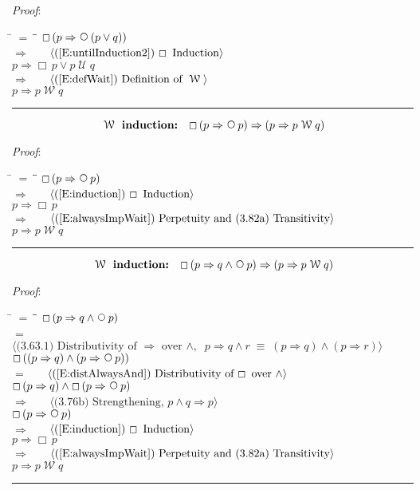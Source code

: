 \documentclass[12pt, fleqn, leqno]{article}
\newcommand{\lgap}{2pt}                             %
\newcommand{\mymathindent}{24pt}                    %
\newcommand{\equivs}{\ensuremath{\;\equiv\;}}       %
\newcommand{\impl}{\ensuremath{\Rightarrow}}        %
\newcommand{\Until}{\;\mathcal{U}\;}
\newcommand{\Wait}{\;\mathcal{W}\;}
\newcommand{\Next}{\;\,\text{\raisebox{3.5pt}{\circle{6}}}}
\newcommand{\Always}{\Box\,}
\newcommand{\myqed}{\rule[-.23ex]{1.2ex}{2.0ex}}
\newcommand{\myqedtab}{\hspace{384pt}}              %
\newcommand{\Gll} {\langle}                         %
\newcommand{\Ggg} {\rangle}                         %
\newcommand{\Hint}[1]     {\ \ \ $\Gll              \mbox{#1} \Ggg$ }   %
\begin{document}
\emph{Proof}:
\begin{tabbing}
\hspace{\mymathindent} \= $= \;$ \= \myqedtab \= \kill
  \> \>   $\Always (p \impl \Next (p\lor q))$\\[\lgap]
  \> $\impl$  \>  \Hint{(\ref{E:untilInduction2}) $\Always$ Induction}\\[\lgap]
  \> \>   $p \impl \Always p\lor p\Until q$\\[\lgap]
  \> $\impl$  \>  \Hint{(\ref{E:defWait}) Definition of $\Wait$}\\[\lgap]
  \> \>   $p \impl p \Wait q$ \quad \myqed
\end{tabbing}
\begin{equation}\label{E:waitInduct1}
\textbf{$\Wait$ induction:}\quad \Always (p \impl \Next p) \impl  (p \impl p \Wait q)
\end{equation}

\emph{Proof}:
\begin{tabbing}
\hspace{\mymathindent} \= $= \;$ \= \myqedtab \= \kill
  \> \>   $\Always (p \impl \Next p)$\\[\lgap]
  \> $\impl$  \>  \Hint{(\ref{E:induction}) $\Always$ Induction}\\[\lgap]
  \> \>   $p \impl \Always p$\\[\lgap]
  \> $\impl$  \>  \Hint{(\ref{E:alwaysImpWait}) Perpetuity and (3.82a) Transitivity}\\[\lgap]
  \> \>   $p \impl p \Wait q$ \quad \myqed
\end{tabbing}
\begin{equation}\label{E:waitInduct2}
\textbf{$\Wait$ induction:}\quad \Always (p \impl q \land \Next p) \impl  (p \impl p \Wait q)
\end{equation}

\emph{Proof}:
\begin{tabbing}
\hspace{\mymathindent} \= $= \;$ \= \myqedtab \= \kill
  \> \>   $\Always (p \impl q \land \Next p)$\\[\lgap]
  \> $=$  \>  \Hint{(3.63.1) Distributivity of $\impl$ over $\land,\;\; p\impl q\land r\equivs (p\impl q)\land (p\impl r)$}\\[\lgap]
  \> \>   $\Always ((p \impl q) \land (p\impl\Next p))$\\[\lgap]
  \> $=$  \>  \Hint{(\ref{E:distAlwaysAnd}) Distributivity of $\Always$ over $\land$}\\[\lgap]
  \> \>   $\Always (p \impl q) \land \Always(p\impl\Next p)$\\[\lgap]
  \> $\impl$ \> \Hint{(3.76b) Strengthening, $p\land q \impl p$} \\[\lgap]
  \> \>   $\Always(p\impl\Next p)$\\[\lgap]
  \> $\impl$  \>  \Hint{(\ref{E:induction}) $\Always$ Induction}\\[\lgap]
  \> \>   $p \impl \Always p$\\[\lgap]
  \> $\impl$  \>  \Hint{(\ref{E:alwaysImpWait}) Perpetuity and (3.82a) Transitivity}\\[\lgap]
  \> \>   $p \impl p \Wait q$ \quad \myqed
\end{tabbing}
\end{document}
